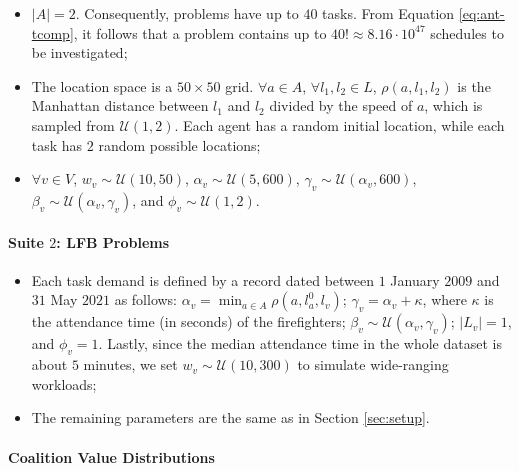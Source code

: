 \begin{itemize}
    \item $|A| = 2$. Consequently, problems have up to $40$ tasks. From Equation
        \ref{eq:ant-tcomp}, it follows that a problem contains up to $40! \approx 8.16
        \cdot 10^{47}$ schedules to be investigated;
    \item The location space is a $50 \times 50$ grid. $\forall a \in A$, $\forall l_1,
        l_2 \in L$, $\rho(a, l_1, l_2)$ is the Manhattan distance between $l_1$ and $l_2$
        divided by the speed of $a$, which is sampled from $\mathcal{U}(1, 2)$. Each
        agent has a random initial location, while each task has $2$ random possible
        locations;
    \item $\forall v \in V$, $w_v \sim \mathcal{U}(10, 50)$, $\alpha_v \sim \mathcal{U}(5,
        600)$, $\gamma_v \sim \mathcal{U}(\alpha_v, 600)$, $\beta_v \sim
        \mathcal{U}(\alpha_v, \gamma_v)$, and $\phi_v \sim \mathcal{U}(1, 2)$.
\end{itemize}

\paragraph{Suite $2$: LFB Problems}

\begin{itemize}
    \item Each task demand is defined by a record dated between $1$ January $2009$ and
        $31$ May $2021$ as follows: $\alpha_v = \min_{a \in A} \rho(a, l^0_a, l_v)$;
        $\gamma_v = \alpha_v + \kappa$, where $\kappa$ is the attendance time (in seconds)
        of the firefighters; $\beta_v \sim \mathcal{U}(\alpha_v, \gamma_v)$; $|L_v| = 1$,
        and $\phi_v = 1$. Lastly, since the median attendance time in the whole dataset
        is about $5$ minutes, we set $w_v \sim \mathcal{U}(10, 300)$ to simulate
        wide-ranging workloads;
    \item The remaining parameters are the same as in Section \ref{sec:setup}.
\end{itemize}

\paragraph{Coalition Value Distributions}

